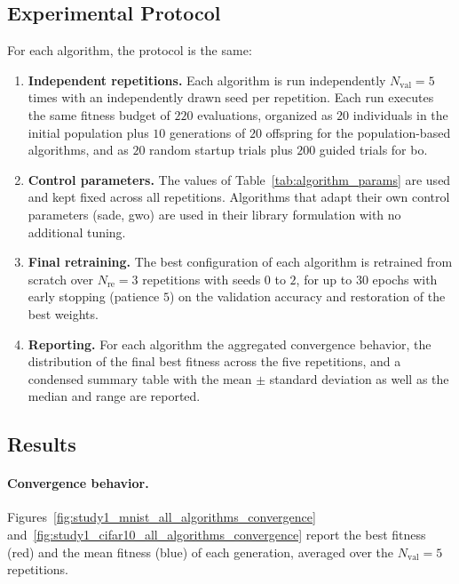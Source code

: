\subsection{Experimental Protocol}
\label{subsec:study1_protocol}

For each algorithm, the protocol is the same:

\begin{enumerate}
    \item \textbf{Independent repetitions.} Each algorithm is run independently $N_{\mathrm{val}} = 5$ times with an independently drawn seed per repetition. Each run executes the same fitness budget of $220$ evaluations, organized as $20$ individuals in the initial population plus $10$ generations of $20$ offspring for the population-based algorithms, and as $20$ random startup trials plus $200$ guided trials for \acrshort{bo}.

    \item \textbf{Control parameters.} The values of Table~\ref{tab:algorithm_params} are used and kept fixed across all repetitions. Algorithms that adapt their own control parameters (\acrshort{sade}, \acrshort{gwo}) are used in their library formulation with no additional tuning.

    \item \textbf{Final retraining.} The best configuration of each algorithm is retrained from scratch over $N_{\mathrm{re}} = 3$ repetitions with seeds $0$ to $2$, for up to $30$ epochs with early stopping (patience $5$) on the validation accuracy and restoration of the best weights.

    \item \textbf{Reporting.} For each algorithm the aggregated convergence behavior, the distribution of the final best fitness across the five repetitions, and a condensed summary table with the mean $\pm$ standard deviation as well as the median and range are reported.
\end{enumerate}

\subsection{Results}
\label{subsec:study1_results}

\paragraph{Convergence behavior.}
Figures~\ref{fig:study1_mnist_all_algorithms_convergence} and~\ref{fig:study1_cifar10_all_algorithms_convergence} report the best fitness (red) and the mean fitness (blue) of each generation, averaged over the $N_{\mathrm{val}}=5$ repetitions.

